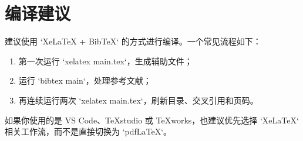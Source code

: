 \section{编译建议}
建议使用 `XeLaTeX + BibTeX` 的方式进行编译。一个常见流程如下：

\begin{enumerate}
\item 第一次运行 `xelatex main.tex`，生成辅助文件；
\item 运行 `bibtex main`，处理参考文献；
\item 再连续运行两次 `xelatex main.tex`，刷新目录、交叉引用和页码。
\end{enumerate}

如果你使用的是 VS Code、TeXstudio 或 TeXworks，也建议优先选择 `XeLaTeX` 相关工作流，而不是直接切换为 `pdfLaTeX`。

